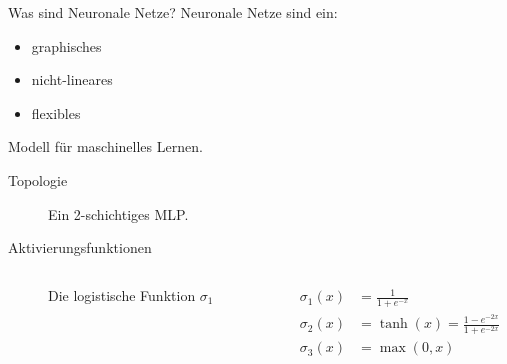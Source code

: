 \documentclass[10pt, compress, xetex]{beamer}
\begin{document}
\begin{frame}{Was sind Neuronale Netze?}
Neuronale Netze sind ein:
\begin{itemize}
\item graphisches
\item nicht-lineares
\item flexibles
\end{itemize}
Modell für maschinelles Lernen.
\end{frame}

\begin{frame}{Topologie}
\begin{figure}[ht!]
\label{fig:MLP}
  \centering
    
  \caption{Ein 2-schichtiges MLP.}
\end{figure}

\end{frame}


\begin{frame}{Aktivierungsfunktionen}
\begin{columns}[c]
  \begin{column}[c]{.6\textwidth}
  \begin{figure}[ht!]
  \centering
  \caption{Die logistische Funktion $\sigma_1$}
\end{figure}
  \end{column}  
  \begin{column}[c]{.5\textwidth}
    \begin{align}
      \sigma_1(x) & =  \frac{1}{1+e^{-x}} \\
      \sigma_2(x) & =  \tanh(x) = \frac{1-e^{-2x}}{1+e^{-2x}} \\
      \sigma_3(x) & =  \max(0,x)
    \end{align}
    \end{column}
\end{columns} 

\end{frame}
\end{document}

